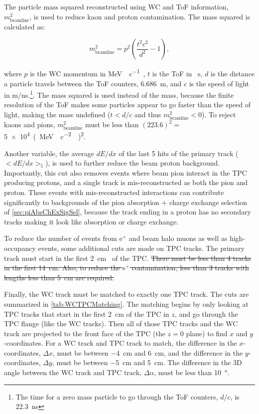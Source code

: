 \documentclass[letterpaper,12pt]{article}
\newcommand{\MeV}{\mega\electronvolt}
\newcommand{\MeVc}{\MeV{}\per c}
\newcommand{\MeVcc}{\MeV{}\per\square c}
\newcommand{\ep}{\ensuremath{\text{e}^{+}}}
\newcommand{\mSqrBeam}{\ensuremath{m^2_{\mathrm{beamline}}}}
\begin{document}
The particle mass squared reconstructed using WC and ToF information,
\mSqrBeam{}, is used to reduce kaon and proton contamination. The mass squared
is calculated as:

\begin{equation}
\mSqrBeam{} = p^2 \left( \frac{t^2 c^2}{d^2} - 1 \right),
\end{equation}

where $p$ is the WC momentum in \si{\MeVc{}}, $t$ is the ToF in \si{\nano
\second}, $d$ is the distance a particle travels between the ToF counters,
\SI{6.686}{\meter}, and $c$ is the speed of light in \si[per-mode =
symbol]{\meter \per \nano \second}.\footnote{The time for a zero mass particle
to go through the ToF counters, $d/c$, is \SI{22.3}{\nano \second}}. The mass
squared is used instead of the mass, because the finite resolution of the ToF
makes some particles appear to go faster than the speed of light, making the
mass undefined ($t < d/c$ and thus $\mSqrBeam{} < 0$). To reject kaons and
pions, \mSqrBeam{} must be less than $(223.6)^2 = $ \SI{5e4}{(\MeVcc{}
)\squared}.

Another variable, the average $dE/dx$ of the last 5 hits of the primary track
($<dE/dx>_5$), is used to further reduce the beam proton background.
Importantly, this cut also removes events where beam pion interact in the TPC
producing protons, and a single track is mis-reconstructed as both the pion and
proton. These events with mis-reconstructed interactions can contribute
significantly to backgrounds of the pion absorption $+$ charge exchange
selection of \cref{sec:piAbsChExSigSel}, because the track ending in a proton
has no secondary tracks making it look like absorption or charge exchange.

To reduce the number of events from \ep{} and beam halo muons as well as
high-occupancy events, some additional cuts are made on TPC tracks. The primary
track must start in the first \SI{2}{\cm{}} of the TPC. \sout{There must be
less than 4 tracks in the first \SI{14}{\cm}. Also, to reduce the \ep{}
contamination, less than 3 tracks with lengths less than \SI{5}{\cm} are
required.} %

Finally, the WC track must be matched to exactly one TPC track. The cuts are
summarized in \cref{tab:WCTPCMatching}. The matching begins by only looking at
TPC tracks that start in the first \SI{2}{\cm} of the TPC in $z$, and go
through the TPC flange (like the WC tracks). Then all of those TPC tracks and
the WC track are projected to the front face of the TPC (the $z=0$ plane) to
find $x$ and $y$-coordinates. For a WC track and TPC track to match, the
difference in the $x$-coordinates, $\Delta x$, must be between \SI{-4}{\cm} and
\SI{6}{\cm}, and the difference in the $y$-coordinates, $\Delta y$, must be
between \SI{-5}{\cm} and \SI{5}{\cm}. The difference in the 3D angle between
the WC track and TPC track, $\Delta \alpha$, must be less than
\SI{10}{\degree}.
\end{document}
